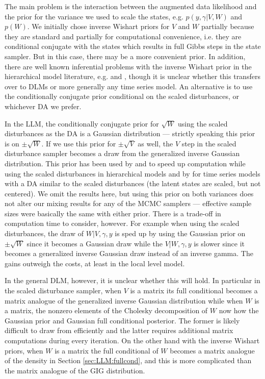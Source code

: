 \documentclass{article}
\begin{document}
The main problem is the interaction between the augmented data likelihood and the prior for the variance we used to scale the states, e.g. $p(y,\gamma|V,W)$ and $p(W)$. We initially chose inverse Wishart priors for $V$ and $W$ partially because they are standard and partially for computational convenience, i.e. they are conditional conjugate with the states which results in full Gibbs steps in the state sampler. But in this case, there may be a more convenient prior. In addition, there are well known inferential problems with the inverse Wishart prior in the hierarchical model literature, e.g.  and , though it is unclear whether this transfers over to DLMs or more generally any time series model. An alternative is to use the conditionally conjugate prior conditional on the scaled disturbances, or whichever DA we prefer.

In the LLM, the conditionally conjugate prior for $\sqrt{W}$ using the scaled disturbances as the DA is a Gaussian distribution --- strictly speaking this prior is on $\pm \sqrt{W}$. If we use this prior for $\pm\sqrt{V}$ as well, the $V$ step in the scaled disturbance sampler becomes a draw from the generalized inverse Gaussian distribution. This prior has been used by  and  to speed up computation while using the scaled disturbances in hierarchical models and by  for time series models with a DA similar to the scaled disturbances (the latent states are scaled, but not centered). We omit the results here, but using this prior on both variances does not alter our mixing results for any of the MCMC samplers --- effective sample sizes were basically the same with either prior. There is a trade-off in computation time to consider, however. For example when using the scaled disturbances, the draw of $W|V,\gamma,y$ is sped up by using the Gaussian prior on $\pm\sqrt{W}$ since it becomes a Gaussian draw while the $V|W,\gamma,y$ is slower since it becomes a generalized inverse Gaussian draw instead of an inverse gamma. The gains outweigh the costs, at least in the local level model.

In the general DLM, however, it is unclear whether this will hold. In particular in the scaled disturbance sampler, when $V$ is a matrix its full conditional becomes a matrix analogue of the generalized inverse Gaussian distribution while when $W$ is a matrix, the nonzero elements of the Cholesky decomposition of $W$ now how the Gaussian prior and Gaussian full conditional posterior. The former is likely difficult to draw from efficiently and the latter requires additional matrix computations during every iteration. On the other hand with the inverse Wishart priors, when $W$ is a matrix the full conditional of $W$ becomes a matrix analogue of the density in Section \ref{sec:LLM:fullcond}, and this is more complicated than the matrix analogue of the GIG distribution.




\clearpage

\end{document}
